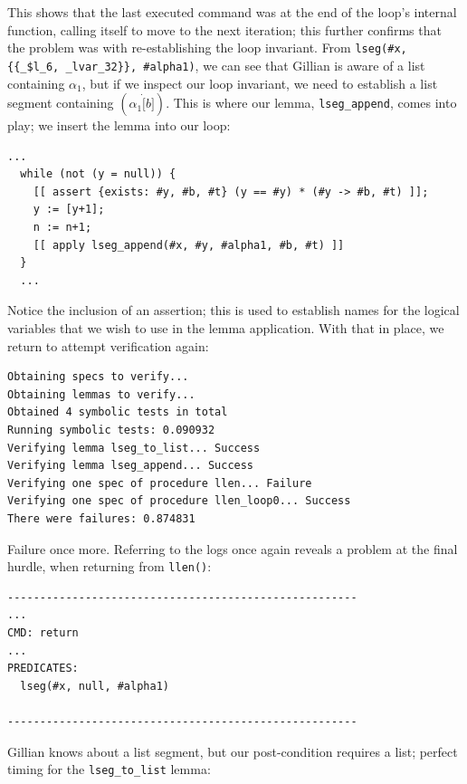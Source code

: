 This shows that the last executed command was at the end of the loop's internal
function, calling itself to move to the next iteration; this further confirms
that the problem was with re-establishing the loop invariant. From
\texttt{lseg(\#x, \{\{\_\$l\_6, \_lvar\_32\}\}, \#alpha1)}, we can see that Gillian
is aware of a list containing $\alpha_1$, but if we inspect our loop invariant,
we need to establish a list segment containing $(\alpha_1 \dot [b])$. This is
where our lemma, \texttt{lseg\_append}, comes into play; we insert the lemma
into our loop:
\begin{lstlisting}[style=code, numbers=none, caption={Applying \texttt{lseg\_append}}]
  ...
  while (not (y = null)) {
    [[ assert {exists: #y, #b, #t} (y == #y) * (#y -> #b, #t) ]];
    y := [y+1];
    n := n+1;
    [[ apply lseg_append(#x, #y, #alpha1, #b, #t) ]]
  }
  ...
\end{lstlisting}

Notice the inclusion of an assertion; this is used to establish names for the logical variables that we wish to use in the lemma application. With that in place, we return to attempt verification again:

\begin{lstlisting}[style=code, numbers=none, caption={WISL list length - list / list segment error}]
Obtaining specs to verify...
Obtaining lemmas to verify...
Obtained 4 symbolic tests in total
Running symbolic tests: 0.090932
Verifying lemma lseg_to_list... Success
Verifying lemma lseg_append... Success
Verifying one spec of procedure llen... Failure
Verifying one spec of procedure llen_loop0... Success
There were failures: 0.874831
\end{lstlisting}

Failure once more. Referring to the logs once again reveals a problem at the final hurdle, when returning from \texttt{llen()}:

\begin{lstlisting}[numbers=none, style=code, caption={WISL list length - list / list segment error, Gillian log file}]
------------------------------------------------------
...
CMD: return
...
PREDICATES:
  lseg(#x, null, #alpha1)

------------------------------------------------------
\end{lstlisting}

Gillian knows about a list segment, but our post-condition requires a list; perfect timing for the \texttt{lseg\_to\_list} lemma:

